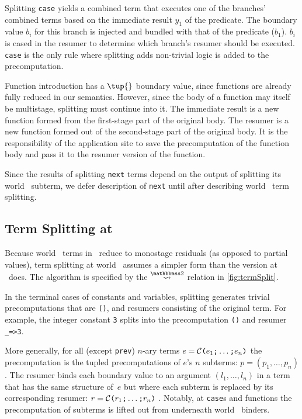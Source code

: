 \begin{abstrsyn}
Splitting {\tt case} yields a combined term that executes one of the branches' combined terms based on the immediate result $y_1$ of the predicate.
The boundary value $b_i$ for this branch is injected and bundled with that of the predicate ($b_1$).   
$b_i$ is cased in the resumer to determine which branch's resumer should be executed.
{\tt case} is the only rule where splitting adds non-trivial logic is added to the precomputation.

Function introduction has a $\tup{}$ boundary value,
since functions are already fully reduced in our semantics.
However, since the body of a function may itself be multistage, splitting must continue into it.
The immediate result is a new function formed from the first-stage part of the original body.
The resumer is a new function formed out of the second-stage part of the original body.
It is the responsibility of the application site to save the precomputation of the function body
and pass it to the resumer version of the function.

Since the results of splitting \texttt{next} terms depend on the output of
splitting its world \bbtwo\ subterm,
we defer description of \texttt{next} until after describing world \bbtwo\ term splitting.

\subsection{Term Splitting at \bbtwo}

Because world \bbtwo\ terms in \lang\ reduce to monostage residuals (as opposed to partial values),
term splitting at world \bbtwo\ assumes a simpler form than the version at \bbonem\ does. 
The algorithm is specified by the $\splittwosym$ relation in \cref{fig:termSplit}.

In the terminal cases of
constants and variables, splitting generates trivial precomputations that are \texttt{()}, and resumers consisting of the original term.
For example, the integer constant \texttt{3} splits into the
precomputation \texttt{()} and resumer \texttt{\_=>3}.

More generally, for all (except \texttt{prev}) 
$n$-ary terms $e = \mathcal{C}\texttt{(} e_1 \texttt{;} \ldots \texttt{;} e_n \texttt{)}$ 
the precomputation is the tupled precomputations of $e$'s $n$ subterms:
$p=(p_1,\ldots,p_n)$.  The resumer binds each boundary value to an
argument $(l_1,\ldots,l_n)$ in a term that has the same structure
of~$e$ but where each subterm is replaced by its corresponding resumer:
$r = \mathcal{C}\texttt{(} r_1 \texttt{;} \ldots \texttt{;} r_n \texttt{)}$ .
Notably, at \texttt{case}s and functions the
precomputation of subterms is lifted out from underneath world \bbtwo\ binders.  


\end{abstrsyn}

